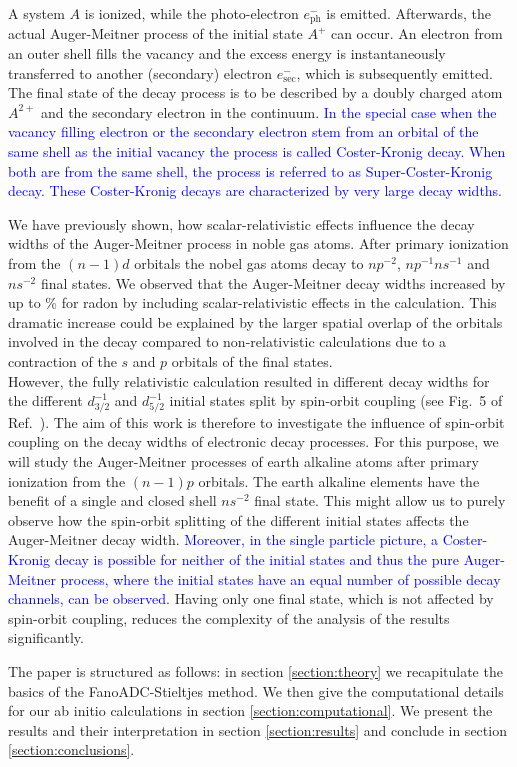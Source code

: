 A system $A$ is ionized, while the photo-electron $e^-_\text{ph}$ is emitted.      
Afterwards, the actual Auger-Meitner
process of the initial state $A^+$ can occur.    
An electron from an outer                                       
shell fills the vacancy and the excess energy is instantaneously transferred  
to another (secondary) electron $e^-_\text{sec}$, which
is subsequently emitted. The final state of the decay process   
is to be described by a doubly charged atom $A^{2+}$ and the secondary        
electron in the continuum.
\textcolor{blue}
{In the special case when the vacancy filling electron or the secondary
electron stem from an orbital
of the same shell as the initial vacancy the process is called Coster-Kronig decay.
When both are from the same shell, the process is referred to as Super-Coster-Kronig
decay. These Coster-Kronig decays are characterized by very large decay widths.
\cite{Coster35}
}

We have previously shown, how
scalar-relativistic effects influence the decay widths of the Auger-Meitner
process in
noble gas atoms. \cite{Fasshauer15_1}
After primary ionization from the $(n-1)d$ orbitals the nobel
gas atoms decay to $np^{-2}$, $np^{-1}ns^{-1}$ and $ns^{-2}$ final states.
We observed that the Auger-Meitner decay widths increased by up to \unit[326]{\%}
for radon
by including scalar-relativistic effects in the calculation. This
dramatic increase could be explained by the larger spatial
overlap of the orbitals
involved in the decay compared to non-relativistic calculations due to
a contraction of the $s$ and $p$ orbitals of the final states.\\
However, the fully relativistic calculation resulted in different decay widths
for the different $d_{3/2}^{-1}$ and $d_{5/2}^{-1}$ initial states split by
spin-orbit coupling (see Fig.~5 of Ref.~\cite{Fasshauer15_1}).
The aim of this work is therefore to investigate the
influence of spin-orbit coupling on the decay widths of electronic decay processes.
For this purpose, we will study the Auger-Meitner processes of earth alkaline atoms
after primary ionization from the $(n-1)p$ orbitals. The earth alkaline elements
have the benefit of a single and closed shell $ns^{-2}$ final state.
This might allow us to purely observe how the spin-orbit splitting of
the different initial states affects the Auger-Meitner decay width.
\textcolor{blue}
{
Moreover, in the single particle picture, a Coster-Kronig decay is possible for neither
of the initial states and thus the pure Auger-Meitner process, where the initial
states have an equal number of possible decay channels, can be observed.
}
Having only one final state, which is not affected by spin-orbit coupling,
reduces the complexity of the analysis of the results significantly.

The paper is structured as follows:
in section \ref{section:theory} we recapitulate the basics of the
FanoADC-Stieltjes method. We then give the computational details for our
ab initio calculations in section \ref{section:computational}. We present the
results and their interpretation in section \ref{section:results}
and conclude in section \ref{section:conclusions}.
